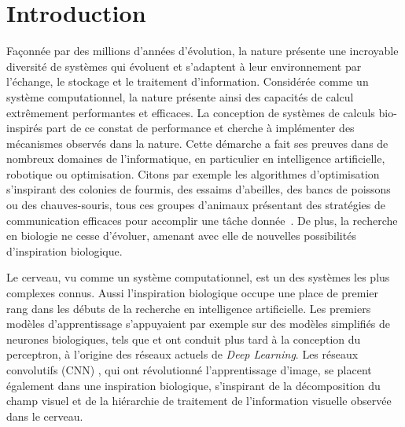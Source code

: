 \chapter*{Introduction}

Façonnée par des millions d'années d'évolution, la nature présente une incroyable diversité de systèmes qui évoluent et s'adaptent à leur environnement par l'échange, le stockage et le traitement d'information.
Considérée comme un système computationnel, la nature présente ainsi des capacités de calcul extrêmement performantes et efficaces. La conception de systèmes de calculs bio-inspirés part de ce constat de performance et cherche à implémenter des mécanismes observés dans la nature.
Cette démarche a fait ses preuves dans de nombreux domaines de l'informatique, en particulier en intelligence artificielle, robotique ou optimisation. Citons par exemple les algorithmes d'optimisation s'inspirant des colonies de fourmis, des essaims d'abeilles, des bancs de poissons ou des chauves-souris, tous ces groupes d'animaux présentant des stratégies de communication efficaces pour accomplir une tâche donnée~\parencite{Darwish2018BioinspiredCA}.
De plus, la recherche en biologie ne cesse d'évoluer, amenant avec elle de nouvelles possibilités d'inspiration biologique.


Le cerveau, vu comme un système computationnel, est un des systèmes les plus complexes connus.
Aussi l'inspiration biologique occupe une place de premier rang dans les débuts de la recherche en intelligence artificielle. Les premiers modèles d'apprentissage s'appuyaient par exemple sur des modèles simplifiés de neurones biologiques, tels que \cite{McCulloch1990ALC} et ont conduit plus tard à la conception du perceptron, à l'origine des réseaux actuels de \emph{Deep Learning}. 
Les réseaux convolutifs (CNN) \parencite{LeCun1998ConvolutionalNF}, qui ont révolutionné l'apprentissage d'image, se placent également dans une inspiration biologique, s'inspirant de la décomposition du champ visuel et de la hiérarchie de traitement de l'information visuelle observée dans le cerveau.

